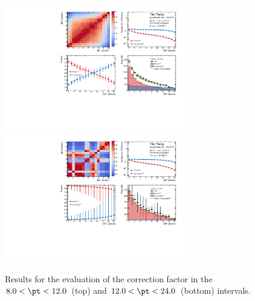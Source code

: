 \begin{figure}
    \centering
    \includegraphics[width=0.7\textwidth]{Figures/Chapter 6/AllPropmtFracs/Dplus/DplusPromptFrac80_120.pdf}
    \includegraphics[width=0.7\textwidth]{Figures/Chapter 6/AllPropmtFracs/Dplus/DplusPromptFrac120_240.pdf}
    \caption{Results for the evaluation of the \fpdpl correction factor in the $8.0 < \pt < 12.0$~\gevc (top) and $12.0 < \pt < 24.0$~\gevc (bottom) intervals.}
    \end{figure}
        
